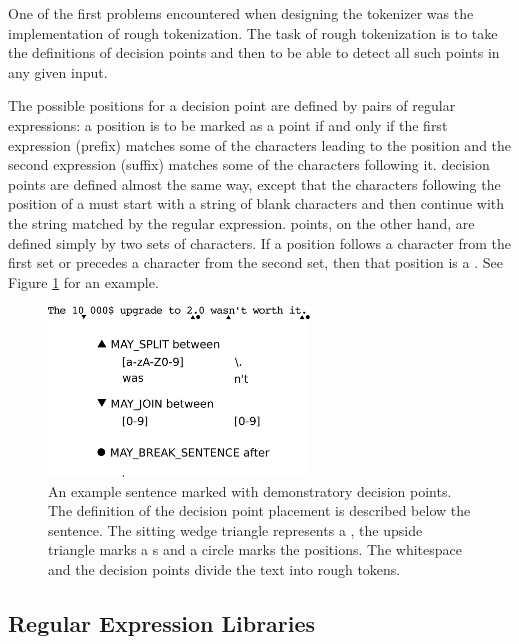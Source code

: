 One of the first problems encountered when designing the tokenizer was the
implementation of rough tokenization. The task of rough tokenization is to take
the definitions of decision points and then to be able to detect all such points
in any given input.

The possible positions for a \maysplit{} decision point are defined by pairs of
regular expressions: a position is to be marked as a \maysplit{} point if and
only if the first expression (prefix) matches some of the characters
leading to the position and the second expression (suffix) matches some of
the characters following it. \mayjoin{} decision points are defined almost the
same way, except that the characters following the position of a \mayjoin{}
must start with a string of blank characters and then continue with the string
matched by the regular expression. \maybreaksentence{} points, on the other
hand, are defined simply by two sets of characters. If a position follows a
character from the first set or precedes a character from the second set, then
that position is a \maybreaksentence{}. See Figure \ref{fig:decision-points} for an example.

\begin{figure}
  \includegraphics[width=0.618033988\textwidth]{img/decisionpoints.eps}
  \caption{An example sentence marked with demonstratory decision points. The
           definition of the decision point placement is described below the
           sentence. The sitting wedge triangle represents a \maysplit{}, the
           upside triangle marks a \mayjoin{}s and a circle marks the
           \maybreaksentence{} positions. The whitespace and the decision
           points divide the text into rough tokens.}
  \label{fig:decision-points}
\end{figure}


\subsection{Regular Expression Libraries}
\label{ssec:impl-roughtok-regex}

